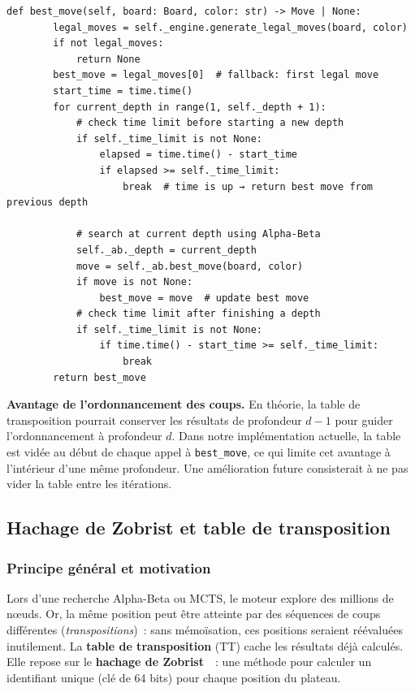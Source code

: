 \documentclass[a4paper,11pt]{article}
\begin{document}
\begin{verbatim}
def best_move(self, board: Board, color: str) -> Move | None:    
        legal_moves = self._engine.generate_legal_moves(board, color)
        if not legal_moves:
            return None
        best_move = legal_moves[0]  # fallback: first legal move
        start_time = time.time()
        for current_depth in range(1, self._depth + 1):
            # check time limit before starting a new depth
            if self._time_limit is not None:
                elapsed = time.time() - start_time
                if elapsed >= self._time_limit:
                    break  # time is up → return best move from previous depth

            # search at current depth using Alpha-Beta
            self._ab._depth = current_depth
            move = self._ab.best_move(board, color)
            if move is not None:
                best_move = move  # update best move
            # check time limit after finishing a depth
            if self._time_limit is not None:
                if time.time() - start_time >= self._time_limit:
                    break
        return best_move
\end{verbatim}

\textbf{Avantage de l'ordonnancement des coups.} En théorie, la table de transposition pourrait 
conserver les résultats de profondeur $d{-}1$
pour guider l'ordonnancement à profondeur $d$.
Dans notre implémentation actuelle, la table est vidée au début de chaque appel à 
\texttt{best\_move}, ce qui limite cet avantage à l'intérieur d'une même profondeur.
Une amélioration future consisterait à ne pas vider la table entre les itérations.


\subsection{Hachage de Zobrist et table de transposition}
\label{sec:zobrist}

\subsubsection{Principe général et motivation}

Lors d'une recherche Alpha-Beta ou MCTS, le moteur explore des millions de
nœuds. Or, la même position peut être atteinte par des séquences de coups
différentes (\emph{transpositions})~: sans mémoïsation, ces positions seraient
réévaluées inutilement. La \textbf{table de transposition} (TT) cache
les résultats déjà calculés. Elle repose sur le \textbf{hachage de
Zobrist}~\cite{Zobrist1970}~: une méthode pour calculer
un identifiant unique (clé de 64 bits) pour chaque position du plateau.
\end{document}
